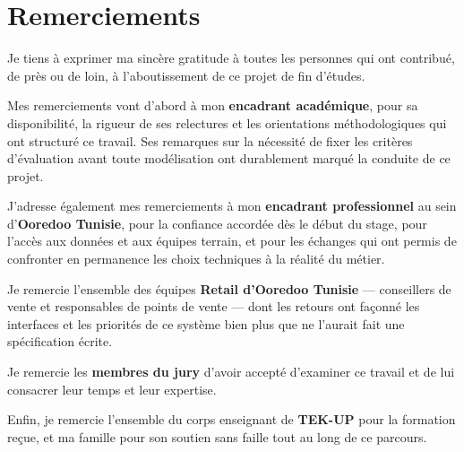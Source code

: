 \chapter*{\huge Remerciements}


Je tiens à exprimer ma sincère gratitude à toutes les personnes qui ont contribué,
de près ou de loin, à l'aboutissement de ce projet de fin d'études.

Mes remerciements vont d'abord à mon \textbf{encadrant académique}, pour sa disponibilité,
la rigueur de ses relectures et les orientations méthodologiques qui ont structuré ce travail.
Ses remarques sur la nécessité de fixer les critères d'évaluation avant toute modélisation
ont durablement marqué la conduite de ce projet.

J'adresse également mes remerciements à mon \textbf{encadrant professionnel} au sein
d'\textbf{Ooredoo Tunisie}, pour la confiance accordée dès le début du stage, pour l'accès
aux données et aux équipes terrain, et pour les échanges qui ont permis de confronter
en permanence les choix techniques à la réalité du métier.

Je remercie l'ensemble des équipes \textbf{Retail d'Ooredoo Tunisie} — conseillers de vente
et responsables de points de vente — dont les retours ont façonné les interfaces et
les priorités de ce système bien plus que ne l'aurait fait une spécification écrite.

Je remercie les \textbf{membres du jury} d'avoir accepté d'examiner ce travail et de lui
consacrer leur temps et leur expertise.

Enfin, je remercie l'ensemble du corps enseignant de \textbf{TEK-UP} pour la formation reçue,
et ma famille pour son soutien sans faille tout au long de ce parcours.
